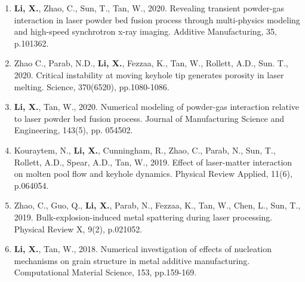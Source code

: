 \documentclass[11pt, letterpaper]{article}
\begin{document}
\begin{enumerate}[leftmargin=*, labelsep=4mm]
   \item \textbf{Li, X.}, Zhao, C., Sun, T., Tan, W., 2020. Revealing transient powder-gas
      interaction in laser powder bed fusion process through multi-physics modeling and high-speed
      synchrotron x-ray imaging. Additive Manufacturing, 35, p.101362. 

   \item Zhao C., Parab, N.D., \textbf{Li, X.}, Fezzaa, K., Tan, W., Rollett, A.D., Sun. T., 2020.
      Critical instability at moving keyhole tip generates porosity in laser melting. Science,
      370(6520), pp.1080-1086.

   \item \textbf{Li, X.}, Tan, W., 2020. Numerical modeling of powder-gas interaction relative to
      laser powder bed fusion process. Journal of Manufacturing Science and Engineering, 143(5), pp.
      054502.

   \item Kouraytem, N., \textbf{Li, X.}, Cunningham, R., Zhao, C., Parab, N., Sun, T., Rollett,
      A.D., Spear, A.D., Tan, W., 2019. Effect of laser-matter interaction on molten pool flow and
      keyhole dynamics. Physical Review Applied, 11(6), p.064054.

   \item Zhao, C., Guo, Q., \textbf{Li, X.}, Parab, N., Fezzaa, K., Tan, W., Chen, L., Sun, T.,
      2019. Bulk-explosion-induced metal spattering during laser processing. Physical Review X,
      9(2), p.021052.

   \item \textbf{Li, X.}, Tan, W., 2018. Numerical investigation of effects of nucleation mechanisms
      on grain structure in metal additive manufacturing. Computational Material Science, 153,
      pp.159-169.

\end{enumerate}
\end{document}
